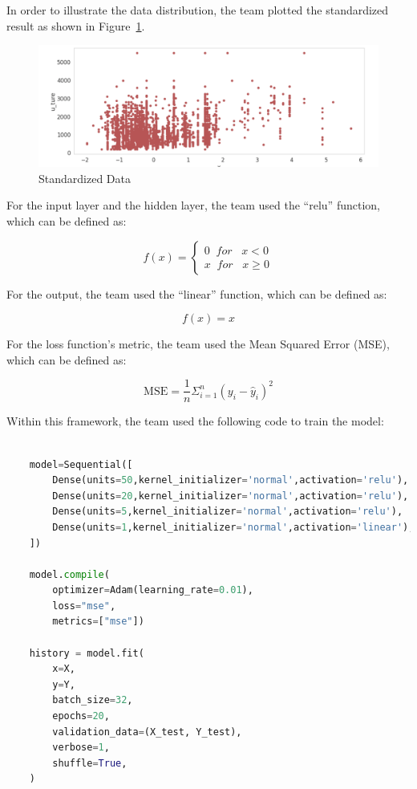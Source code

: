 \documentclass{scrartcl}
\begin{document}
\newpage

\noindent In order to illustrate the data distribution, the team plotted the standardized result as shown in Figure~\ref{fig:NN4}. 

\begin{figure}[H]
	\begin{center}
		\includegraphics[scale=1.0]{Graphics/Neural Network Images/NN4.png}
	\end{center}
	\caption{Standardized Data}
	\label{fig:NN4}
\end{figure}


\noindent For the input layer and the hidden layer, the team used the “relu” function, which can be defined as:

\[f(x) = \left\{\begin{matrix}
0 \;\;for \;\;\;x<0\\ 
x \;\;for \;\;\;x\geqslant 0
\end{matrix}\right.\]

\noindent For the output, the team used the “linear” function, which can be defined as: 

\[f(x) = x\]

\noindent For the loss function’s metric, the team used the Mean Squared Error (MSE), which can be defined as:

\[\mathrm{MSE}=\frac{1}{n} \Sigma_{i=1}^n\left(y_i-\hat{y}_i\right)^2\]

\noindent Within this framework, the team used the following code to train the model:

\begin{lstlisting}[language=Python, caption= Code for training overall data, basicstyle=\tiny,captionpos=b]

    model=Sequential([
        Dense(units=50,kernel_initializer='normal',activation='relu'),    
        Dense(units=20,kernel_initializer='normal',activation='relu'),
        Dense(units=5,kernel_initializer='normal',activation='relu'),
        Dense(units=1,kernel_initializer='normal',activation='linear'),
    ])

    model.compile(
        optimizer=Adam(learning_rate=0.01),
        loss="mse",
        metrics=["mse"])

    history = model.fit(
        x=X,
        y=Y,
        batch_size=32,
        epochs=20,
        validation_data=(X_test, Y_test),
        verbose=1,
        shuffle=True,
    )

\end{lstlisting}
\end{document}
